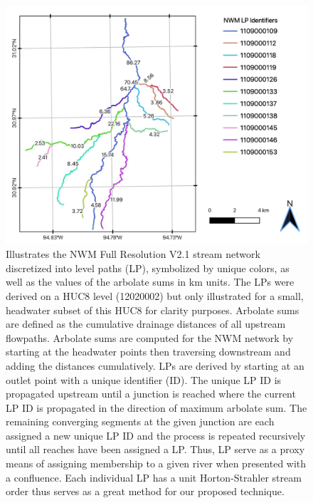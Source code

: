 \begin{figure}[H]
\centering
\includegraphics[scale=1.0]{figures/level_path_methods.jpg}
\caption{Illustrates the NWM Full Resolution V2.1 stream network discretized into level paths (LP), symbolized by unique colors, as well as the values of the arbolate sums in km units.
The LPs were derived on a HUC8 level (12020002) but only illustrated for a small, headwater subset of this HUC8 for clarity purposes.
Arbolate sums are defined as the cumulative drainage distances of all upstream flowpaths.
Arbolate sums are computed for the NWM network by starting at the headwater points then traversing downstream and adding the distances cumulatively. 
LPs are derived by starting at an outlet point with a unique identifier (ID).
The unique LP ID is propagated upstream until a junction is reached where the current LP ID is propagated in the direction of maximum arbolate sum.
The remaining converging segments at the given junction are each assigned a new unique LP ID and the process is repeated recursively until all reaches have been assigned a LP.
Thus, LP serve as a proxy means of assigning membership to a given river when presented with a confluence.
Each individual LP has a unit Horton-Strahler stream order thus serves as a great method for our proposed technique.
}
\label{fig:level_path_methods}
\end{figure}
%
%
